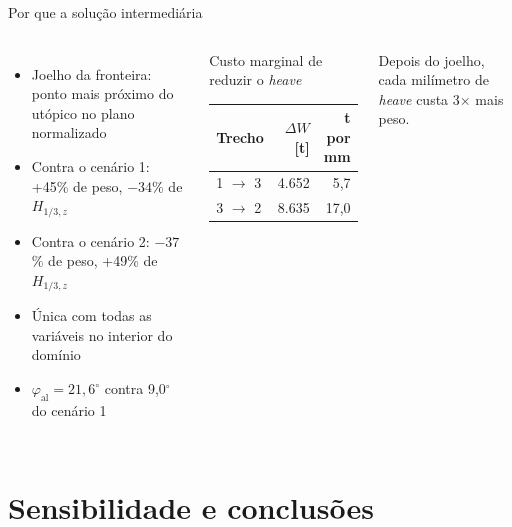 \documentclass[aspectratio=169,10pt]{beamer}
\newcommand{\phial}{\varphi_{\mathrm{al}}}
\newcommand{\Hz}{H_{1/3,z}}
\begin{document}
\begin{frame}{Por que a solução intermediária}
\begin{columns}[T]
\small
\begin{itemize}
\item Joelho da fronteira: ponto mais próximo do utópico no plano normalizado
\item Contra o cenário 1: +45\% de peso, $-34$\% de $\Hz$
\item Contra o cenário 2: $-37$\% de peso, +49\% de $\Hz$
\item Única com todas as variáveis no interior do domínio
\item $\phial = 21{,}6^\circ$ contra 9,0$^\circ$ do cenário 1
\end{itemize}
\small
\begin{block}{Custo marginal de reduzir o \emph{heave}}
\begin{tabular}{lrr}
\toprule
Trecho & $\Delta W$ [t] & t por mm \\
\midrule
1 $\to$ 3 & 4.652 & 5,7 \\
3 $\to$ 2 & 8.635 & 17,0 \\
\bottomrule
\end{tabular}
\end{block}
Depois do joelho, cada milímetro de \emph{heave} custa 3$\times$ mais peso.
\end{columns}
\end{frame}

\section{Sensibilidade e conclusões}
\end{document}
